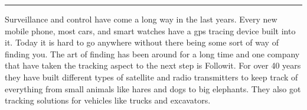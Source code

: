 
\vspace{-10ex}%
\rule{\textwidth}{0.3pt}
\vspace{5ex}


Surveillance and control have come a long way in the last years. Every new mobile phone, most cars, and smart watches have a \gls{gps} tracing device built into it. Today it is hard to go anywhere without there being some sort of way of finding you. The art of finding has been around for a long time and one company that have taken the tracking aspect to the next step is Followit. For over 40 years they have built different types of satellite and radio transmitters to keep track of everything from small animals like hares and dogs to big elephants. They also got tracking solutions for vehicles like trucks and excavators. 


\thispagestyle{empty}